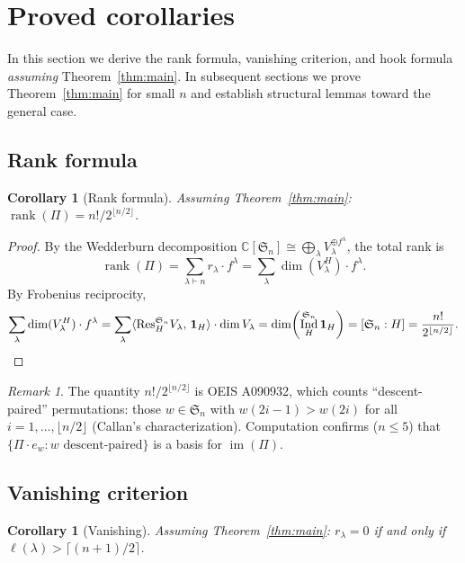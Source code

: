 \documentclass[11pt]{article}
\newtheorem{corollary}[theorem]{Corollary}
\theoremstyle{definition}
\theoremstyle{remark}
\newtheorem{remark}[theorem]{Remark}
\newcommand{\CC}{\mathbb{C}}
\newcommand{\Sym}{\mathfrak{S}}
\newcommand{\im}{\operatorname{im}}
\newcommand{\rk}{\operatorname{rank}}
\DeclareMathOperator{\Ind}{Ind}
\begin{document}
\section{Proved corollaries}

In this section we derive the rank formula, vanishing criterion, and
hook formula \emph{assuming} Theorem~\ref{thm:main}. In subsequent
sections we prove Theorem~\ref{thm:main} for small $n$ and establish
structural lemmas toward the general case.


\subsection{Rank formula}

\begin{corollary}[Rank formula]
\label{cor:rank}
Assuming Theorem~\ref{thm:main}:
$\rk(\Pi) = n!/2^{\lfloor n/2\rfloor}$.
\end{corollary}

\begin{proof}
By the Wedderburn decomposition $\CC[\Sym_n] \cong \bigoplus_\lambda
V_\lambda^{\oplus f^\lambda}$, the total rank is
\[
  \rk(\Pi) = \sum_{\lambda \vdash n} r_\lambda \cdot f^\lambda
  = \sum_\lambda \dim(V_\lambda^H) \cdot f^\lambda.
\]
By Frobenius reciprocity,
\[
  \sum_\lambda \dim(V_\lambda^H) \cdot f^\lambda
  = \sum_\lambda \langle \mathrm{Res}^{\Sym_n}_H V_\lambda,\,
    \mathbf{1}_H \rangle \cdot \dim V_\lambda
  = \dim\!\left(\Ind_H^{\Sym_n} \mathbf{1}_H\right)
  = [\Sym_n : H] = \frac{n!}{2^{\lfloor n/2\rfloor}}. \qedhere
\]
\end{proof}

\begin{remark}
The quantity $n!/2^{\lfloor n/2\rfloor}$ is OEIS A090932, which counts
``descent-paired'' permutations: those $w \in \Sym_n$ with
$w(2i{-}1) > w(2i)$ for all $i = 1, \ldots, \lfloor n/2\rfloor$
(Callan's characterization). Computation confirms ($n \le 5$) that
$\{\Pi \cdot e_w : w \text{ descent-paired}\}$ is a basis for $\im(\Pi)$.
\end{remark}


\subsection{Vanishing criterion}

\begin{corollary}[Vanishing]
\label{cor:vanishing}
Assuming Theorem~\ref{thm:main}:
$r_\lambda = 0$ if and only if $\ell(\lambda) > \lceil(n+1)/2\rceil$.
\end{corollary}
\end{document}
